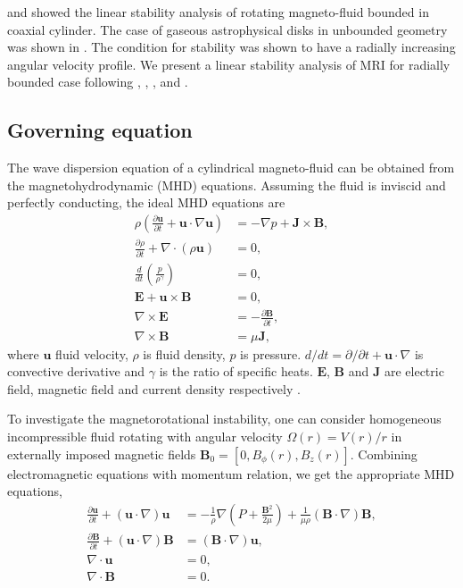 \documentclass{jfm}
\newcommand{\del}{\nabla}
\begin{document}
\cite{Acheson1973} and \cite{Knobloch1992} showed the linear stability analysis
of rotating magneto-fluid bounded in coaxial cylinder. The case of gaseous 
astrophysical disks in unbounded geometry was shown in \cite{Balbus1991}. The 
condition for stability was shown to have a radially increasing angular velocity 
profile. We present a linear stability analysis of MRI for radially bounded case 
following \cite{Acheson1972}, \cite{Acheson1973a}, \cite{Knobloch1992}, and 
\cite{Julien2010}.


%
%
\subsection{Governing equation}

The wave dispersion equation of a cylindrical magneto-fluid can be obtained 
from the magnetohydrodynamic (MHD) equations. Assuming the fluid is inviscid 
and perfectly conducting, the ideal MHD equations are 
\begin{align}
    \rho\left(\frac{\partial\mathbf{u}}{\partial t}+\mathbf{u}\cdot\del\mathbf{u}\right) &= -\del p +\mathbf{J}\times\mathbf{B} , \\
    \frac{\partial \rho}{\partial t} + \del\cdot(\rho \mathbf{u})&=0 , \\
    \frac{d}{dt}\left(\frac{p}{\rho^\gamma}\right)&=0 , \\
    \mathbf{E}+\mathbf{u}\times\mathbf{B}&=0 , \\
    \del\times \mathbf{E} &= -\frac{\partial \mathbf{B}}{\partial t} , \\
    \del \times \mathbf{B} &= \mu \mathbf{J} ,
\end{align}
where $\mathbf{u}$ fluid velocity, $\rho$ is fluid density, $p$ is pressure. 
$d/dt=\partial/\partial t +\mathbf{u}\cdot\del$ is convective derivative and 
$\gamma$ is the ratio of specific heats. $\mathbf{E}$, $\mathbf{B}$ and 
$\mathbf{J}$ are electric field, magnetic field and current density respectively
\citep{Freidberg1987}.

To investigate the magnetorotational instability, one can consider homogeneous
incompressible fluid rotating with angular velocity $\Omega(r)=V(r) / r$ in
externally imposed magnetic fields $\mathbf{B}_0 = [0,B_\phi(r),B_z(r)]$.
Combining electromagnetic equations with momentum relation, we get the
appropriate MHD equations,
\begin{align}
    \frac{\partial \mathbf{u}}{\partial t}+(\mathbf{u}\cdot\del)\mathbf{u} &= -\frac{1}{\rho}\del\left(P+\frac{\mathbf{B}^2}{2\mu}\right)+\frac{1}{\mu\rho}(\mathbf{B}\cdot\del)\mathbf{B} , \\
    \frac{\partial \mathbf{B}}{\partial t} +(\mathbf{u}\cdot\del)\mathbf{B} &=(\mathbf{B}\cdot\del)\mathbf{u} ,\\
    \del\cdot\mathbf{u}&=0 , \\
    \del \cdot \mathbf{B} &= 0 .
\end{align}
\end{document}
